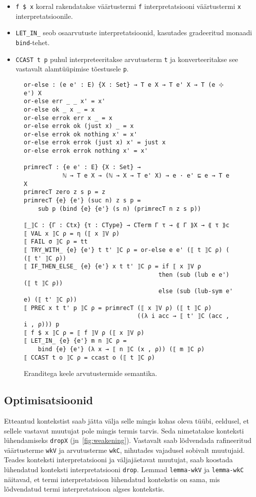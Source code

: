 \documentclass[a4paper,12pt]{article}
\begin{document}
\begin{itemize}
\item {\tt f \$ x} korral rakendatakse väärtustermi {\tt f} interpretatsiooni väärtustermi {\tt x} interpretatsioonile.
\item {\tt LET_IN_} seob osaarvutuste interpretatsioonid, kasutades gradeeritud monaadi {\tt bind}-tehet.
\item {\tt CCAST t p} puhul interpreteeritakse arvutusterm {\tt t} ja konverteeritakse see vastavalt alamtüüpimise tõestusele {\tt p}.
\end{itemize}

\begin{figure}
  \begin{BVerbatim}
or-else : (e e' : E) {X : Set} → T e X → T e' X → T (e ⊹ e') X
or-else err _ _ x' = x'
or-else ok _ x _ = x
or-else errok err x _ = x
or-else errok ok (just x) _ = x
or-else errok ok nothing x' = x'
or-else errok errok (just x) x' = just x
or-else errok errok nothing x' = x'

primrecT : {e e' : E} {X : Set} →
           ℕ → T e X → (ℕ → X → T e' X) → e · e' ⊑ e → T e X
primrecT zero z s p = z
primrecT {e} {e'} (suc n) z s p =
    sub p (bind {e} {e'} (s n) (primrecT n z s p))

⟦_⟧C : {Γ : Ctx} {τ : CType} → CTerm Γ τ → ⟪ Γ ⟫X → ⟪ τ ⟫c
⟦ VAL x ⟧C ρ = η (⟦ x ⟧V ρ)
⟦ FAIL σ ⟧C ρ = tt
⟦ TRY_WITH_ {e} {e'} t t' ⟧C ρ = or-else e e' (⟦ t ⟧C ρ) ( (⟦ t' ⟧C ρ))
⟦ IF_THEN_ELSE_ {e} {e'} x t t' ⟧C ρ = if ⟦ x ⟧V ρ
                                      then (sub (lub e e') (⟦ t ⟧C ρ))
                                      else (sub (lub-sym e' e) (⟦ t' ⟧C ρ))
⟦ PREC x t t' p ⟧C ρ = primrecT (⟦ x ⟧V ρ) (⟦ t ⟧C ρ)
                                ((λ i acc → ⟦ t' ⟧C (acc , i , ρ))) p
⟦ f $ x ⟧C ρ = ⟦ f ⟧V ρ (⟦ x ⟧V ρ)
⟦ LET_IN_ {e} {e'} m n ⟧C ρ =
    bind {e} {e'} (λ x → ⟦ n ⟧C (x , ρ)) (⟦ m ⟧C ρ)
⟦ CCAST t o ⟧C ρ = ccast o (⟦ t ⟧C ρ)
  \end{BVerbatim}
  \caption{Eranditega keele arvutustermide semantika.}
  \label{fig:exc.cterm-semantics}
\end{figure}

\subsection{Optimisatsioonid}\label{ssec:exc.optimizations}

Etteantud kontekstist saab jätta välja selle mingis kohas oleva tüübi, eeldusel, et sellele vastavat muutujat pole mingis termis tarvis.
Seda nimetatakse konteksti lühendamiseks {\tt dropX} (jn~\ref{fig:weakening}).
Vastavalt saab lõdvendada rafineeritud väärtusterme {\tt wkV} ja arvutusterme {\tt wkC}, nihutades vajadusel sobivalt muutujaid.
Teades konteksti interpretatsiooni ja väljajäetavat muutujat, saab koostada lühendatud konteksti interpretatsiooni {\tt drop}.
Lemmad {\tt lemma-wkV} ja {\tt lemma-wkC} näitavad, et termi interpretatsioon lühendatud kontekstis on sama, mis lõdvendatud termi interpretatsioon algses kontekstis.
\end{document}

